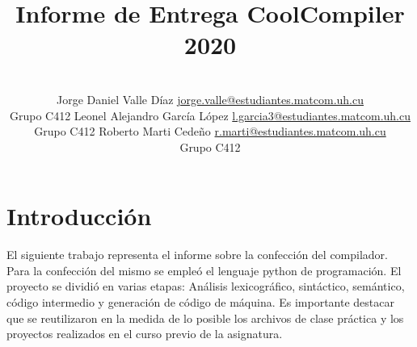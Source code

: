 \documentclass[a4paper,10pt,twocolumn]{article}
\title{Informe de Entrega CoolCompiler 2020}
\author{\\
	\name  Jorge Daniel Valle Díaz \email \href{mailto:jorge.valle@estudiantes.matcom.uh.cu}{jorge.valle@estudiantes.matcom.uh.cu}
	\\ \addr Grupo C412 \AND
	\name Leonel Alejandro Garc\'ia L\'opez \email \href{mailto:l.garcia3@estudiantes.matcom.uh.cu}{l.garcia3@estudiantes.matcom.uh.cu}
	\\ \addr Grupo C412 \AND
	\name Roberto Marti Cede\~no \email \href{mailto:r.marti@estudiantes.matcom.uh.cu}{r.marti@estudiantes.matcom.uh.cu}
	\\ \addr Grupo C412
}
\begin{document}



\section{Introducción}\label{sec:intro}
	El siguiente trabajo representa el informe sobre la confección del compilador. Para la confección del mismo se empleó el lenguaje python de programación. El proyecto se dividió en varias etapas: Análisis lexicográfico, sintáctico, semántico, código intermedio y generación de código de máquina. Es importante destacar que se reutilizaron en la medida de lo posible los archivos de clase práctica y los proyectos realizados en el curso previo de la asignatura.
\end{document}
